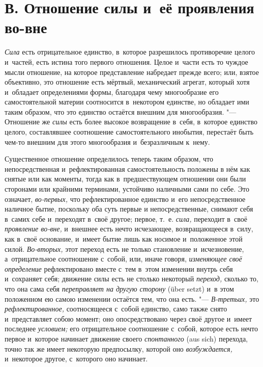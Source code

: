 \section[В. Отношение силы и~её проявления во-вне]
{В. Отношение силы и~её проявления во-вне}

{\em Сила} есть
отрицательное единство, в~которое разрешилось противоречие целого и~частей,
есть истина того первого отношения. Целое и~части есть то чуждое мысли
отношение, на которое представление набредает прежде всего; или, взятое
объективно, это отношение есть мёртвый, механический агрегат, который хотя
и~обладает определениями формы, благодаря чему многообразие его
самостоятельной материи соотносится в~некотором единстве, но обладает ими
таким образом, что это единство остаётся внешним для многообразия. "---
Отношение же {\em силы} есть более высокое возвращение
в~себя, в~которое единство целого, составлявшее соотношение
самостоятельного инобытия, перестаёт быть чем-то внешним для этого
многообразия и~безразличным к~нему.

Существенное отношение определилось теперь таким образом, что
непосредственная и~рефлектированная самостоятельность положены в
нём
как снятые или как моменты, тогда как в~предшествующем отношении они были
сторонами или крайними терминами, устойчиво наличными сами по себе. Это
означает, {\em во-первых,} что рефлектированное
единство и~его непосредственное наличное бытие, поскольку оба суть первые и
непосредственные, снимают себя в~самих себе и~переходят в~своё другое;
первое, т.~е. {\em сила,} переходит в~своё
{\em проявление во-вне,} и~внешнее есть нечто
исчезающее, возвращающееся в~силу, как в~своё основание, и~имеет бытие лишь
как носимое и~положенное этой силой. {\em Во-вторых,}
этот переход есть не только становление и~исчезновение, а~отрицательное
соотношение с~собой, или, иначе говоря, {\em изменяющее
своё определение} рефлектировано вместе с~тем в~этом изменении внутрь себя
и~сохраняет себя; движение силы есть не столько некоторый
{\em переход,} сколько то, что она сама себя
{\em переправляет на другую сторону} (über setzt) и~в
этом положенном ею самою изменении остаётся тем, что она есть. "---
{\em В-третьих,} это {\em рефлектированное,} соотносящееся с~собой единство,
само также снято и~представляет собою момент; оно опосредствовано через
своё другое и~имеет последнее {\em условием;} его
отрицательное соотношение с~собой, которое есть нечто первое и~которое
начинает движение своего {\em спонтанного} (aus sich) перехода,
точно так же имеет некоторую предпосылку, которой оно
{\em возбуждается,} и~некоторое другое, с~которого оно начинает.


